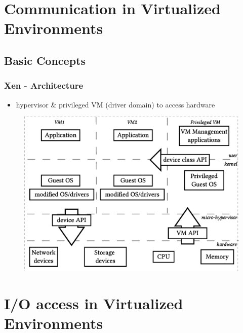 \documentclass[red,slidestop,notes,compress,mathserif]{beamer}
\begin{document}
\section{Communication in Virtualized Environments}

\subsection{Basic Concepts}

\begin{frame}
\frametitle{Xen - Architecture}
\begin{itemize}
\item hypervisor \& privileged VM (driver domain) to access hardware
\end{itemize}
\begin{figure}
\center
\includegraphics[width=.65\linewidth]{figures/paravirt.eps}
\end{figure}
\end{frame}

\section{I/O access in Virtualized Environments}
\end{document}
